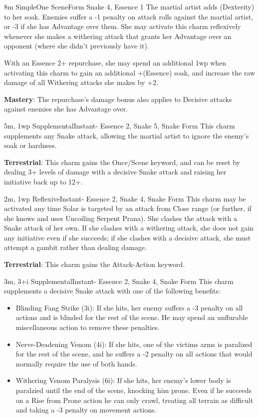 
{8m}
{Simple}{One Scene}{Form}
{Snake 4, Essence 1}
The martial artist adds (Dexterity) to her soak. Enemies suffer a -1 penalty on attack rolls against the martial artist, or -3 if she has Advantage over them. She may activate this charm reflexively whenever she makes a withering attack that grants her Advantage over an opponent (where she didn't previously have it).

With an Essence 2+ repurchase, she may spend an additional 1wp when activating this charm to gain an additional +(Essence) soak, and increase the raw damage of all Withering attacks she makes by +2.

\textbf{Mastery}: The repurchase's damage bonus also applies to Decisive attacks against enemies she has Advantage over.

{5m, 1wp}
{Supplemental}{Instant}{-}
{Essence 2, Snake 5, Snake Form}
This charm supplements any Snake attack, allowing the martial artist to ignore the enemy's soak or hardness.

\textbf{Terrestrial}: This charm gains the Once/Scene keyword, and can be reset by dealing 3+ levels of damage with a decisive Snake attack and raising her initiative back up to 12+.

{2m, 1wp}
{Reflexive}{Instant}{-}
{Essence 2, Snake 4, Snake Form}
This charm may be activated any time Solar is targeted by an attack from Close range (or further, if she knows and uses Uncoiling Serpent Prana). She clashes the attack with a Snake attack of her own. If she clashes with a withering attack, she does not gain any initiative even if she succeeds; if she clashes with a decisive attack, she must attempt a gambit rather than dealing damage.

\textbf{Terrestrial}: This charm gains the Attack-Action keyword.

{3m, 3+i}
{Supplemental}{Instant}{-}
{Essence 2, Snake 4, Snake Form}
This charm supplements a decisive Snake attack with one of the following benefits:

\begin{itemize}
  \item Blinding Fang Strike (3i): If she hits, her enemy suffers a -3 penalty on all actions and is blinded for the rest of the scene. He may spend an unflurable miscellaneous action to remove these penalties.
  \item Nerve-Deadening Venom (4i): If she hits, one of the victims arms is paralized for the rest of the scene, and he suffers a -2 penalty on all actions that would normally require the use of both hands.
  \item Withering Venom Paralysis (6i): If she hits, her enemy's lower body is paralzied until the end of the scene, knocking him prone. Even if he succeeds on a Rise from Prone action he can only crawl, treating all terrain as difficult and taking a -3 penalty on movement actions.
\end{itemize}

